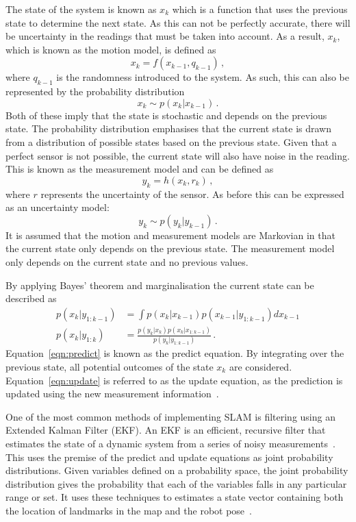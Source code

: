 The state of the system is known as $x_k$ which is a function that uses the previous 
state to determine the next state. As this can not be perfectly accurate, there will 
be uncertainty in the readings that must be taken into account. As a result, $x_k$,
which is known as the motion model, is defined as
\begin{equation}
x_{k} = f(x_{k-1}, q_{k-1})\,,
\end{equation}
where $q_{k-1}$ is the randomness introduced to the system. As such, this can
also be represented by the probability distribution
\begin{equation}
x_{k} \sim p(x_{k} | x_{k-1})\,.
\end{equation}
Both of these imply that the state is stochastic and depends on the previous
state. The probability distribution emphasises that the current state is
drawn from a distribution of possible states based on the previous state. Given that a perfect sensor is not possible, the current state will also have noise
in the reading. This is known as the measurement model and can be defined as
\begin{equation}
y_{k} = h(x_{k}, r_{k})\,,
\end{equation}
where $r$ represents the uncertainty of the sensor. As
before this can be expressed as an uncertainty model:
\begin{equation}
y_{k} \sim p(y_{k} | y_{k-1})\,.
\end{equation}
It is assumed that the motion and measurement models are Markovian in that
the current state only depends on the previous state. The measurement model only
depends on the current state and no previous values.

By applying Bayes' theorem and marginalisation the current state can be described as
\begin{align}
\label{eqn:predict}
p(x_{k} | y_{1:k-1}) & = \int p(x_{k}|x_{k-1}) p(x_{k-1} | y_{1:k-1}) dx_{k-1} \\
\label{eqn:update}
p(x_{k} | y_{1:k}) &= \frac{ p(y_{k}|x_{k})p(x_{k}|x_{1:k-1})}{ p(y_{k}|y_{1:k-1})}\,.
\end{align}
Equation~\ref{eqn:predict} is known as the predict equation. By integrating over
the previous state, all potential outcomes of the state $x_k$ are
considered. Equation~\ref{eqn:update} is referred to as the update equation,
as the prediction is updated using the new measurement information~\cite{kam1997sensorfusion}.

One of the most common methods of implementing SLAM is filtering using an
Extended Kalman Filter (EKF). An EKF is an efficient, recursive filter
that estimates the state of a dynamic system from a series of noisy measurements~\cite{fox2003bayesian}.
This uses the premise of the predict and update equations as joint probability
distributions. Given variables defined on a probability space, the joint
probability distribution gives the probability that each of the variables falls in any
particular range or set. It uses these techniques to estimates a state vector containing
both the location of landmarks in the map and the robot pose~\cite{huang2007convergence}.


